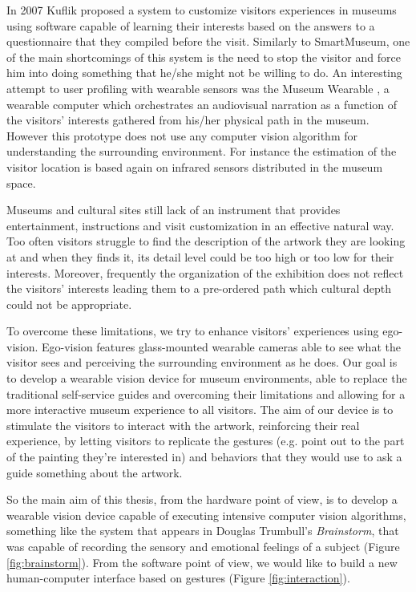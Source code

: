 In 2007 Kuflik \etal \cite{kuflik2011visitor} proposed a system to customize visitors experiences in museums using software capable of learning their interests based on the answers to a questionnaire that they compiled before the visit. Similarly to SmartMuseum, one of the main shortcomings of this system is the need to stop the visitor and force him into doing something that he/she might not be willing to do.
An interesting attempt to user profiling with wearable sensors was the Museum Wearable \cite{sparacino2002museum}, a wearable computer which orchestrates an audiovisual narration as a function of the visitors' interests gathered from his/her physical path in the museum. However this prototype does not use any computer vision algorithm for understanding the surrounding environment. For instance the estimation of the visitor location is based again on infrared sensors distributed in the museum space.

Museums and cultural sites still lack of an instrument that provides entertainment, instructions and visit customization in an effective natural way. Too often visitors struggle to find the description of the artwork they are looking at and when they finds it, its detail level could be too high or too low for their interests. Moreover, frequently the organization of the exhibition does not reflect the visitors' interests leading them to a pre-ordered path which cultural depth could not be appropriate.

To overcome these limitations, we try to enhance visitors' experiences using ego-vision. Ego-vision features glass-mounted wearable cameras able to see what the visitor sees and perceiving the surrounding environment as he does. Our goal is to develop a wearable vision device for museum environments, able to replace the traditional self-service guides and overcoming their limitations and allowing for a more interactive museum experience to all visitors. The aim of our device is to stimulate the visitors to interact with the artwork, reinforcing their real experience, by letting visitors to replicate the gestures (e.g. point out to the part of the painting they're interested in) and behaviors that they would use to ask a guide something about the artwork.

So the main aim of this thesis, from the hardware point of view, is to develop a wearable vision device capable of executing intensive computer vision algorithms, something like the system that appears in Douglas Trumbull's \textit{Brainstorm}, that was capable of recording the sensory and emotional feelings of a subject (Figure \ref{fig:brainstorm}).  From the software point of view, we would like to build a new human-computer interface based on gestures (Figure \ref{fig:interaction}).


